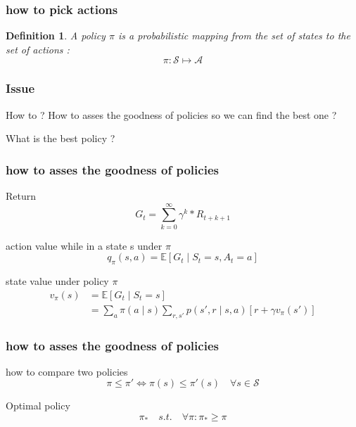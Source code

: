 \documentclass[11pt]{beamer}
\newtheorem{madef}{Definition}
\begin{document}
\begin{frame}
\frametitle{how to pick actions}
\begin{madef}
A \emph{policy} $\pi$ is a probabilistic mapping from the set of states to the set of actions : 
$$ \pi : \mathcal{S} \mapsto \mathcal{A} $$

\end{madef}
\end{frame}

\begin{frame}
\frametitle{Issue}
\begin{alertblock}{How to ?}
How to asses the goodness of policies so we can find the best one ? 

What is the best policy ?
\end{alertblock}
\end{frame}

\begin{frame}
\frametitle{how to asses the goodness of policies}
\begin{block}{Return}
$$ G_t= \sum_{k=0}^{\infty}\gamma^k * R_{t+k+1}$$
\end{block}

\pause
\begin{block}{action value while in a state s under $\pi$}
\begin{equation}
q_{\pi}(s,a) = \mathbb{E}[G_t\mid S_t =s,A_t=a]
\end{equation}
\end{block}

\pause
\begin{block}{state value under policy $\pi$}
\begin{equation}
\begin{split}
v_{\pi}(s)&=\mathbb{E}[G_t \mid S_t=s] 
\\& = \sum_{a}\pi(a\mid s)\sum_{r,s'}p(s',r\mid s,a)[r+\gamma v_{\pi}(s')]
\end{split}
\end{equation}
\end{block}



\end{frame}

\begin{frame}
\frametitle{how to asses the goodness of policies}
\begin{block}{how to compare two policies}
$$ \pi \leq \pi ' \iff  \pi (s)\leq \pi ' (s) \quad \forall s \in \mathcal{S}
$$
\end{block}

\pause 

\begin{block}{Optimal policy}
$$ \pi_{*} \quad s.t. \quad \forall \pi : \pi_{*}\geq \pi $$
\end{block}
\end{frame}
\end{document}
